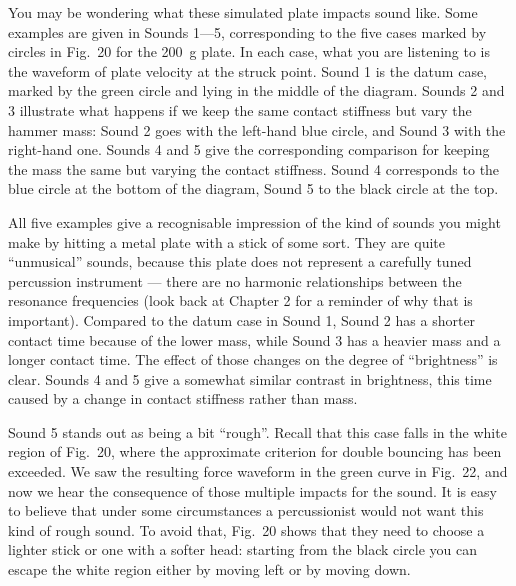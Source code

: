   You may be wondering what these simulated plate impacts sound like. Some 
  examples are given in Sounds 1—5, corresponding to the five cases marked by 
  circles in Fig.\ 20 for the 200~g plate. In each case, what you are listening 
  to is the waveform of plate velocity at the struck point. Sound 1 is the 
  datum case, marked by the green circle and lying in the middle of the 
  diagram. Sounds 2 and 3 illustrate what happens if we keep the same contact 
  stiffness but vary the hammer mass: Sound 2 goes with the left-hand blue 
  circle, and Sound 3 with the right-hand one. Sounds 4 and 5 give the 
  corresponding comparison for keeping the mass the same but varying the 
  contact stiffness. Sound 4 corresponds to the blue circle at the bottom of 
  the diagram, Sound 5 to the black circle at the top. 

  All five examples give a recognisable impression of the kind of sounds you 
  might make by hitting a metal plate with a stick of some sort. They are quite 
  “unmusical” sounds, because this plate does not represent a carefully tuned 
  percussion instrument — there are no harmonic relationships between the 
  resonance frequencies (look back at Chapter 2 for a reminder of why that is 
  important). Compared to the datum case in Sound 1, Sound 2 has a shorter 
  contact time because of the lower mass, while Sound 3 has a heavier mass and 
  a longer contact time. The effect of those changes on the degree of 
  “brightness” is clear. Sounds 4 and 5 give a somewhat similar contrast in 
  brightness, this time caused by a change in contact stiffness rather than 
  mass. 

  Sound 5 stands out as being a bit “rough”. Recall that this case falls in the 
  white region of Fig.\ 20, where the approximate criterion for double bouncing 
  has been exceeded. We saw the resulting force waveform in the green curve in 
  Fig.\ 22, and now we hear the consequence of those multiple impacts for the 
  sound. It is easy to believe that under some circumstances a percussionist 
  would not want this kind of rough sound. To avoid that, Fig.\ 20 shows that 
  they need to choose a lighter stick or one with a softer head: starting from 
  the black circle you can escape the white region either by moving left or by 
  moving down. 


